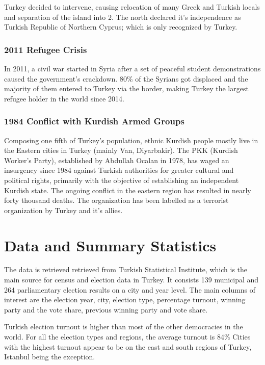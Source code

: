 \documentclass[12pt]{article}
\begin{document}
Turkey decided to intervene, causing relocation of many Greek and Turkish locals and separation of the island into 2. The north declared it's independence as Turkish Republic of Northern Cyprus; which is only recognized by Turkey. 

\subsubsection{2011 Refugee Crisis}

In 2011, a civil war started in Syria after a set of peaceful student demonstrations caused the government's crackdown. 80\% of the Syrians got displaced and the majority of them entered to Turkey via the border, making Turkey the largest refugee holder in the world since 2014. 

\subsubsection{1984 Conflict with Kurdish Armed Groups}

Composing one fifth of Turkey's population, ethnic Kurdish people mostly live in the Eastern cities in Turkey (mainly Van, Diyarbakir). The PKK (Kurdish Worker's Party), established by Abdullah Ocalan in 1978, has waged an insurgency since 1984 against Turkish authorities for greater cultural and political rights, primarily with the objective of establishing an independent Kurdish state. The ongoing conflict in the eastern region has resulted in nearly forty thousand deaths. The organization has been labelled as a terrorist organization by Turkey and it's allies. 


\section{Data and Summary Statistics}

The data is retrieved retrieved from Turkish Statistical Institute, which is the main source for census and election data in Turkey. It consists 139 municipal and 264 parliamentary election results on a city and year level. The main columns of interest are the election year, city, election type, percentage turnout, winning party and the vote share, previous winning party and vote share. 

Turkish election turnout is higher than most of the other democracies in the world. For all the election types and regions, the average turnout is $84\%$ Cities with the highest turnout appear to be on the east and south regions of Turkey, Istanbul being the exception. 
\end{document}

